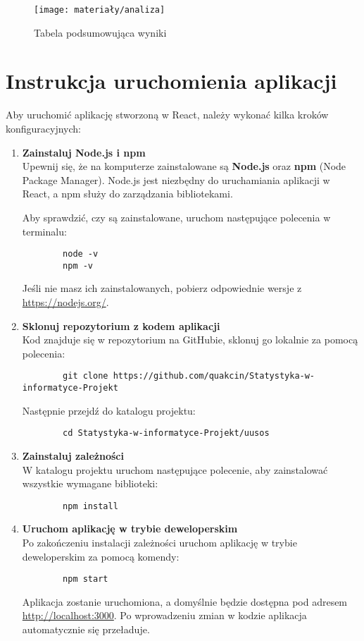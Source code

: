 \begin{figure}[ht]
	\centering
	\texttt{[image: materiały/analiza]}
	\caption{Tabela podsumowująca wyniki}
\end{figure}

\section{Instrukcja uruchomienia aplikacji}

Aby uruchomić aplikację stworzoną w React, należy wykonać kilka kroków konfiguracyjnych:

\begin{enumerate}
	\item \textbf{Zainstaluj Node.js i npm} \\
	Upewnij się, że na komputerze zainstalowane są \textbf{Node.js} oraz \textbf{npm} (Node Package Manager). Node.js jest niezbędny do uruchamiania aplikacji w React, a npm służy do zarządzania bibliotekami.
	
	Aby sprawdzić, czy są zainstalowane, uruchom następujące polecenia w terminalu:
	\begin{verbatim}
		node -v
		npm -v
	\end{verbatim}
	Jeśli nie masz ich zainstalowanych, pobierz odpowiednie wersje z \url{https://nodejs.org/}.
	
	\item \textbf{Sklonuj repozytorium z kodem aplikacji} \\
	Kod znajduje się w repozytorium na GitHubie, sklonuj go lokalnie za pomocą polecenia:
	\begin{verbatim}
		git clone https://github.com/quakcin/Statystyka-w-informatyce-Projekt
	\end{verbatim}
	Następnie przejdź do katalogu projektu:
	\begin{verbatim}
		cd Statystyka-w-informatyce-Projekt/uusos
	\end{verbatim}
	
	\item \textbf{Zainstaluj zależności} \\
	W katalogu projektu uruchom następujące polecenie, aby zainstalować wszystkie wymagane biblioteki:
	\begin{verbatim}
		npm install
	\end{verbatim}
	
	\item \textbf{Uruchom aplikację w trybie deweloperskim} \\
	Po zakończeniu instalacji zależności uruchom aplikację w trybie deweloperskim za pomocą komendy:
	\begin{verbatim}
		npm start
	\end{verbatim}
	Aplikacja zostanie uruchomiona, a domyślnie będzie dostępna pod adresem \url{http://localhost:3000}. Po wprowadzeniu zmian w kodzie aplikacja automatycznie się przeładuje.
\end{enumerate}

